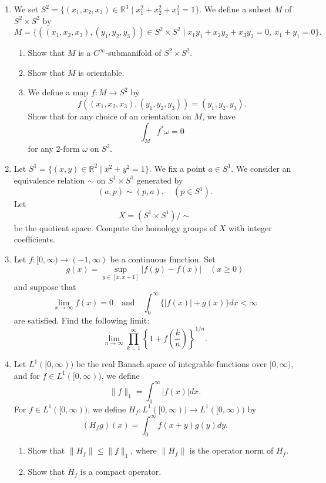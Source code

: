 \documentclass[10pt,a4paper]{article}
\begin{document}
\begin{enumerate}[label=\fbox{\arabic*}]
  \item %
        We set $S^2 = \{ (x_1, x_2, x_3) \in \mathbb{R}^3 \mid x_1^2 + x_2^2 + x_3^2 = 1 \}$. We define a subset $M$ of $S^2 \times S^2$ by
        \[
          M = \{ ((x_1, x_2, x_3), (y_1, y_2, y_3)) \in S^2 \times S^2 \mid x_1 y_1 + x_2 y_2 + x_3 y_3 = 0, \ x_1 + y_1 = 0 \}.
        \]
        \begin{enumerate}[label=(\arabic*)]
          \item Show that $M$ is a $C^\infty$-submanifold of $S^2 \times S^2$.
          \item Show that $M$ is orientable.
          \item We define a map $f : M \to S^2$ by
          \[
            f((x_1, x_2, x_3), (y_1, y_2, y_3)) = (y_1, y_2, y_3).
          \]
          Show that for any choice of an orientation on $M$, we have
          \[
            \int_M f^*\omega = 0
          \]
          for any $2$-form $\omega$ on $S^2$.
        \end{enumerate}

  \item %
        Let $S^1 = \{ (x, y) \in \mathbb{R}^2 \mid x^2 + y^2 = 1 \}$. We fix a point $a \in S^1$. We consider an equivalence relation $\sim$ on $S^1 \times S^1$ generated by
        \[
          (a, p) \sim (p, a), \quad (p \in S^1).
        \]
        Let 
        \[
          X = (S^1 \times S^1) / \sim
        \]
        be the quotient space. Compute the homology groups of $X$ with integer coefficients.

  \item %
        Let $f : [0, \infty) \to (-1, \infty)$ be a continuous function. Set
        \[
          g(x) = \sup_{y \in [x, x+1]} |f(y) - f(x)| \quad (x \ge 0)
        \]
        and suppose that
        \[
          \lim_{x \to \infty} f(x) = 0 \quad \text{and} \quad \int_0^\infty \{|f(x)| + g(x)\} dx < \infty
        \]
        are satisfied. Find the following limit:
        \[
          \lim_{n \to \infty} \prod_{k=1}^\infty \left\{ 1 + f\left(\frac{k}{n}\right) \right\}^{1/n}.
        \]

  \item %
        Let $L^1([0, \infty))$ be the real Banach space of integrable functions over $[0, \infty)$, and for $f \in L^1([0, \infty))$, we define
        \[
          \|f\|_1 = \int_0^\infty |f(x)| dx.
        \]
        For $f \in L^1([0, \infty))$, we define $H_f : L^1([0, \infty)) \to L^1([0, \infty))$ by
        \[
          (H_f g)(x) = \int_0^\infty f(x+y)g(y)dy.
        \]
        \begin{enumerate}[label=(\arabic*)]
          \item Show that $\|H_f\| \le \|f\|_1$, where $\|H_f\|$ is the operator norm of $H_f$.
          \item Show that $H_f$ is a compact operator.
        \end{enumerate}


\end{enumerate}
\end{document}
